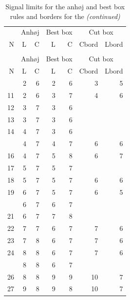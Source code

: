 \begin{Schunk}

\begin{longtable}{rrrrrrr}
\caption{\label{tab:unnamed-chunk-1}Signal limits for the anhøj and best box rules and borders for the cut
        box rules. N = number of trials. L = upper limit for longest run, 
        C = lower limit for number of crossings, Cbord and Lbord = cut box 
        borders to keep.}\\
\toprule
\multicolumn{1}{c}{ } & \multicolumn{2}{c}{Anhøj} & \multicolumn{2}{c}{Best box} & \multicolumn{2}{c}{Cut box} \\
\cmidrule(l{3pt}r{3pt}){2-3} \cmidrule(l{3pt}r{3pt}){4-5} \cmidrule(l{3pt}r{3pt}){6-7}
N & L & C & L & C & Cbord & Lbord\\
\midrule
\endfirsthead
\caption[]{Signal limits for the anhøj and best box rules and borders for the  \textit{(continued)}}\\
\toprule
\multicolumn{1}{c}{ } & \multicolumn{2}{c}{Anhøj} & \multicolumn{2}{c}{Best box} & \multicolumn{2}{c}{Cut box} \\
\cmidrule(l{3pt}r{3pt}){2-3} \cmidrule(l{3pt}r{3pt}){4-5} \cmidrule(l{3pt}r{3pt}){6-7}
N & L & C & L & C & Cbord & Lbord\\
\midrule
\endhead
\
\endfoot
\bottomrule
\endlastfoot
10 & 2 & 6 & 2 & 6 & 3 & 5\\
11 & 2 & 6 & 3 & 7 & 4 & 6\\
12 & 3 & 7 & 3 & 6 &  & \\
13 & 3 & 7 & 3 & 6 &  & \\
14 & 4 & 7 & 3 & 6 &  & \\
\addlinespace
15 & 4 & 7 & 4 & 7 & 6 & 6\\
16 & 4 & 7 & 5 & 8 & 6 & 7\\
17 & 5 & 7 & 5 & 7 &  & \\
18 & 5 & 7 & 5 & 7 & 6 & 6\\
19 & 6 & 7 & 5 & 7 & 6 & 5\\
\addlinespace
20 & 6 & 7 & 6 & 7 &  & \\
21 & 6 & 7 & 7 & 8 &  & \\
22 & 7 & 7 & 6 & 7 & 7 & 6\\
23 & 7 & 8 & 6 & 7 & 7 & 6\\
24 & 8 & 8 & 6 & 7 & 7 & 6\\
\addlinespace
25 & 8 & 8 & 6 & 7 &  & \\
26 & 8 & 8 & 9 & 9 & 10 & 7\\
27 & 9 & 8 & 9 & 8 & 10 & 7\\

\end{longtable}
\end{Schunk}
